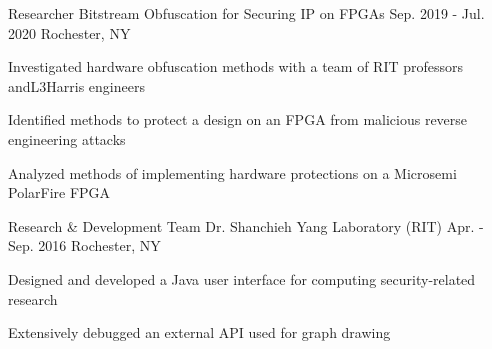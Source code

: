 
\begin{cventries}
	\cvexperience
		{Researcher}
		{Bitstream Obfuscation for Securing IP on FPGAs}
		{Sep. 2019 - Jul. 2020}
		{Rochester, NY}
		{
			\begin{cvitems}
			\item {Investigated hardware obfuscation methods with a team of RIT professors and\linebreak L3Harris engineers}
			\item {Identified methods to protect a design on an FPGA from malicious reverse engineering attacks}
			\item {Analyzed methods of implementing hardware protections on a Microsemi PolarFire FPGA}
			\end{cvitems}
		}

	\cvexperience
		{Research \& Development Team}
		{Dr. Shanchieh Yang Laboratory (RIT)}
		{Apr. - Sep. 2016}
		{Rochester, NY}
		{
			\begin{cvitems}
			\item{Designed and developed a Java user interface for computing security-related research}
			\item{Extensively debugged an external API used for graph drawing}
			\end{cvitems}
		}
\end{cventries}
